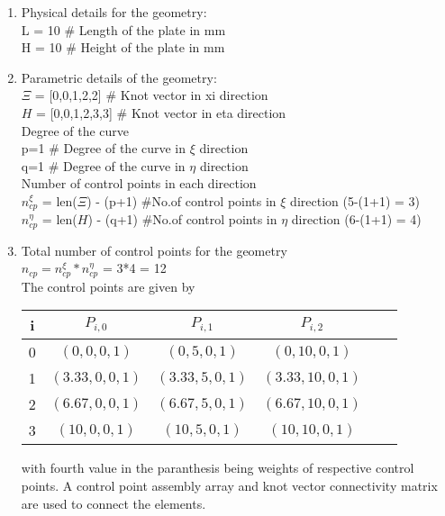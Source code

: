 \documentclass[11pt]{article}
\begin{document}
\begin{enumerate}
	\item Physical details for the geometry: \\
	L = 10 \qquad \# Length of the plate in mm \\
	H = 10 \qquad \# Height of the plate in mm \\
	
	\item Parametric details of the geometry: \\
	$\Xi$ =  [0,0,1,2,2] \qquad \# Knot vector in xi  direction \\
	$H$ = [0,0,1,2,3,3] \qquad \# Knot vector in eta direction \\
	
	Degree of the curve \\
	p=1 \qquad \# Degree of the curve in $\xi$  direction \\
	q=1 \qquad \# Degree of the curve in $\eta$ direction \\
	
	Number of control points in each direction \\
	$n_{cp}^{\xi}$  = len($\Xi$) - (p+1)  \qquad \#No.of control points in $\xi$
	direction (5-(1+1) = 3) \\
	$n_{cp}^{\eta}$ = len($H$) - (q+1)  \qquad \#No.of control points in $\eta$
	direction (6-(1+1) = 4) \\
	
	\item Total number of control points for the geometry \\
	$n_{cp} = n_{cp}^{\xi} * n_{cp}^{\eta}$ = 3*4 = 12\\
	The control points are given by
	\begin{center}
		\begin{tabular}{ |c|c|c|c|c|c| } 
			\hline
			i & $ P_{i,0} $ & $ P_{i,1} $ & $ P_{i,2} $   \\ \hline
			0 & $ (0,0,0,1) $ & $ (0,5,0,1) $ & $ (0,10,0,1) $  \\ \hline
			1 & $ (3.33,0,0,1) $ & $ (3.33,5,0,1) $ & $ (3.33,10,0,1) $  \\ \hline
			2 & $ (6.67,0,0,1) $ & $ (6.67,5,0,1) $ & $ (6.67,10,0,1) $  \\ \hline
			3 & $ (10,0,0,1) $ & $ (10,5,0,1) $ & $ (10,10,0,1) $  \\ \hline
		\end{tabular}
	\end{center}
	with fourth value in the paranthesis being weights of respective control points.
	A control point assembly array and knot vector connectivity matrix are used to connect the elements.
\end{enumerate}
\end{document}
